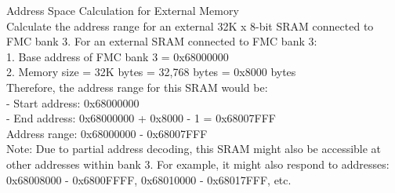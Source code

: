 \begin{example2}{Address Space Calculation for External Memory}\\
Calculate the address range for an external 32K x 8-bit SRAM connected to FMC bank 3.
\tcblower
For an external SRAM connected to FMC bank 3:
\vspace{1mm}\\
1. Base address of FMC bank 3 = 0x68000000\\
2. Memory size = 32K bytes = 32,768 bytes = 0x8000 bytes
\vspace{3mm}\\
Therefore, the address range for this SRAM would be:\\
- Start address: 0x68000000\\
- End address: 0x68000000 + 0x8000 - 1 = 0x68007FFF
\vspace{3mm}\\
Address range: 0x68000000 - 0x68007FFF
\vspace{3mm}\\
Note: Due to partial address decoding, this SRAM might also be accessible at other addresses within bank 3. For example, it might also respond to addresses:\\
0x68008000 - 0x6800FFFF, 0x68010000 - 0x68017FFF, etc.
\end{example2}